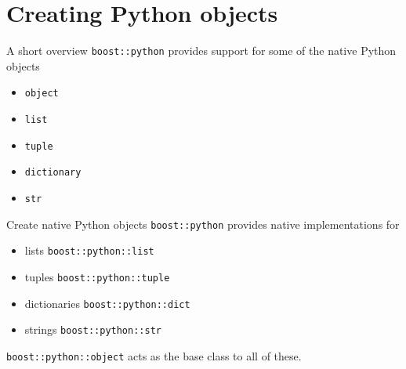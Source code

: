 
\section{Creating Python objects}
\begin{frame}{A short overview}
    \texttt{boost::python} provides support for some of the native 
    Python objects
    \begin{itemize}
        \item \texttt{object}
        \item \texttt{list}
        \item \texttt{tuple}
        \item \texttt{dictionary}
        \item \texttt{str}
    \end{itemize}
\end{frame}

\begin{frame}[fragile]{Create native Python objects}
    \texttt{boost::python} provides native implementations for 
    \begin{itemize}
        \item lists \texttt{boost::python::list}
        \item tuples \texttt{boost::python::tuple}
        \item dictionaries \texttt{boost::python::dict}
        \item strings \texttt{boost::python::str}
    \end{itemize}
    \vspace{0.05\textheight}
    \begin{center}
        
    \end{center}
    \vspace{0.05\textheight}
    \texttt{boost::python::object} acts as the base class to all of these.
\end{frame}

